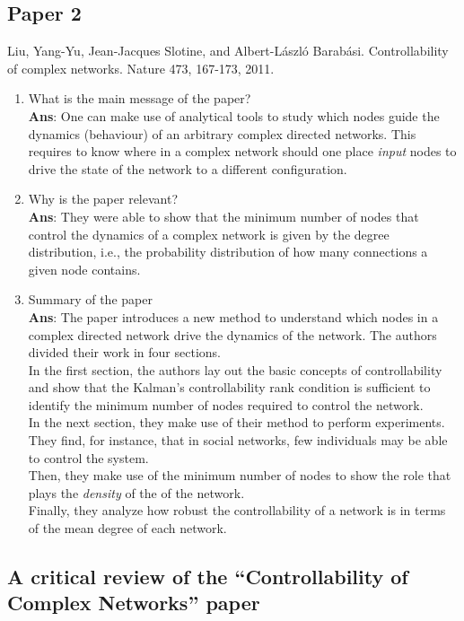 \documentclass[11pt]{article}
\begin{document}
\subsection*{Paper 2}
Liu, Yang-Yu, Jean-Jacques Slotine, and Albert-László Barabási. Controllability of complex networks. Nature 473, 167-173, 2011.
\begin{enumerate}[label=(\alph*)]
	\item What is the main message of the paper? \\ \textbf{Ans}: One can make use of analytical tools to study which nodes guide the dynamics (behaviour) of an arbitrary complex directed networks. This requires to know where in a complex network should one place \textit{input} nodes to drive the state of the network to a different configuration. 
	\item Why is the paper relevant? \\ \textbf{Ans}: They were able to show that the minimum number of nodes that control the dynamics of a complex network is given by the degree distribution, i.e., the probability distribution of how many connections a given node contains.
	\item Summary of the paper \\ \textbf{Ans}: The paper introduces a new method to understand which nodes in a complex directed network drive the dynamics of the network. The authors divided their work in four sections. \\ In the first section, the authors lay out the basic concepts of controllability and show that the Kalman's controllability rank condition is sufficient to identify the minimum number of nodes required to control the network.\\ In the next section, they make use of their method to perform experiments. They find, for instance, that in social networks, few individuals may be able to control the system.\\Then, they make use of the minimum number of nodes to show the role that plays the \textit{density} of the of the network.\\Finally, they analyze how robust the controllability of a network is in terms of the mean degree of each network.
\end{enumerate}

\subsection*{A critical review of the ``Controllability of Complex Networks'' paper}
\end{document}
